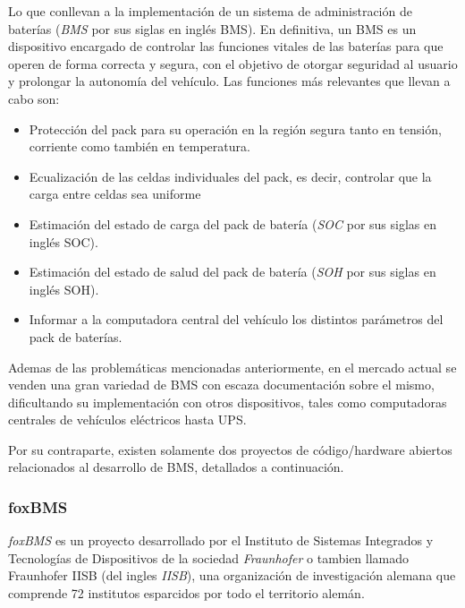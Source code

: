 \documentclass[10pt,a4paper]{article}
\begin{document}
\noindent Lo que conllevan a la implementación de un sistema de administración 
de baterías (\emph{\acrshort{BMS}} por sus siglas en inglés \acrlong{BMS}). En
definitiva, un \acrshort{BMS} es un dispositivo encargado de controlar las
funciones vitales de las baterías para que operen de forma correcta y segura, 
con el objetivo de otorgar seguridad al usuario y prolongar la autonomía del 
vehículo. Las funciones más relevantes que llevan a cabo son:

\begin{itemize}
    \item Protección del pack para su operación en la región segura tanto 
	en tensión, corriente como también en temperatura.
    \item Ecualización de las celdas individuales del pack, es decir,
	controlar que la carga entre celdas sea uniforme
    \item Estimación del estado de carga del pack de batería 
        (\emph{\acrshort{SOC}} por sus siglas en ingl\'es \acrlong{SOC}).
    \item Estimación del estado de salud del pack de batería 
        (\emph{\acrshort{SOH}} por sus siglas en ingl\'es \acrlong{SOH}).
    \item Informar a la computadora central del vehículo los distintos 
	parámetros del pack de baterías.
\end{itemize}

\noindent Ademas de las problem\'aticas mencionadas anteriormente, en el mercado
actual se venden una gran variedad de \acrshort{BMS} con escaza documentaci\'on
sobre el mismo, dificultando su implementaci\'on con otros dispositivos, tales 
como computadoras centrales de veh\'iculos el\'ectricos hasta \acrshort{UPS}.

\noindent Por su contraparte, existen solamente dos proyectos de 
c\'odigo/hardware abiertos relacionados al desarrollo de \acrshort{BMS}, 
detallados a continuaci\'on.

\subsubsection{foxBMS}

\emph{foxBMS} es un proyecto desarrollado por el Instituto de Sistemas
Integrados y Tecnolog\'ias de Dispositivos de la sociedad \emph{Fraunhofer} o
tambien llamado Fraunhofer IISB (del ingles \emph{\acrlong{IISB}}), una
organización de investigación alemana que comprende 72 institutos esparcidos por
todo el territorio alem\'an.
\end{document}
